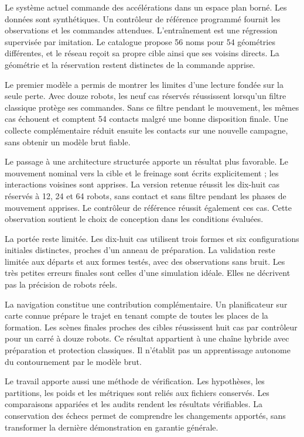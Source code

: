 Le système actuel commande des accélérations dans un espace plan borné. Les données sont synthétiques. Un contrôleur de référence programmé fournit les observations et les commandes attendues. L'entraînement est une régression supervisée par imitation. Le catalogue propose 56 noms pour 54 géométries différentes, et le réseau reçoit sa propre cible ainsi que ses voisins directs. La géométrie et la réservation restent distinctes de la commande apprise.

Le premier modèle a permis de montrer les limites d'une lecture fondée sur la seule perte. Avec douze robots, les neuf cas réservés réussissent lorsqu'un filtre classique protège ses commandes. Sans ce filtre pendant le mouvement, les mêmes cas échouent et comptent 54 contacts malgré une bonne disposition finale. Une collecte complémentaire réduit ensuite les contacts sur une nouvelle campagne, sans obtenir un modèle brut fiable.

Le passage à une architecture structurée apporte un résultat plus favorable. Le mouvement nominal vers la cible et le freinage sont écrits explicitement ; les interactions voisines sont apprises. La version retenue réussit les dix-huit cas réservés à 12, 24 et 64 robots, sans contact et sans filtre pendant les phases de mouvement apprises. Le contrôleur de référence réussit également ces cas. Cette observation soutient le choix de conception dans les conditions évaluées.

La portée reste limitée. Les dix-huit cas utilisent trois formes et six configurations initiales distinctes, proches d'un anneau de préparation. La validation reste limitée aux départs et aux formes testés, avec des observations sans bruit. Les très petites erreurs finales sont celles d'une simulation idéale. Elles ne décrivent pas la précision de robots réels.

La navigation constitue une contribution complémentaire. Un planificateur sur carte connue prépare le trajet en tenant compte de toutes les places de la formation. Les scènes finales proches des cibles réussissent huit cas par contrôleur pour un carré à douze robots. Ce résultat appartient à une chaîne hybride avec préparation et protection classiques. Il n'établit pas un apprentissage autonome du contournement par le modèle brut.

Le travail apporte aussi une méthode de vérification. Les hypothèses, les partitions, les poids et les métriques sont reliés aux fichiers conservés. Les comparaisons appariées et les audits rendent les résultats vérifiables. La conservation des échecs permet de comprendre les changements apportés, sans transformer la dernière démonstration en garantie générale.

